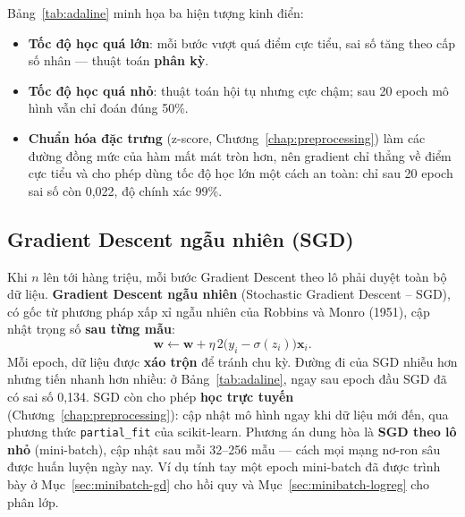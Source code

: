 Bảng~\ref{tab:adaline} minh họa ba hiện tượng kinh điển:
\begin{itemize}
    \item \textbf{Tốc độ học quá lớn}: mỗi bước vượt quá điểm cực tiểu, sai số tăng theo cấp số nhân --- thuật toán \textbf{phân kỳ}.
    \item \textbf{Tốc độ học quá nhỏ}: thuật toán hội tụ nhưng cực chậm; sau 20 epoch mô hình vẫn chỉ đoán đúng 50\%.
    \item \textbf{Chuẩn hóa đặc trưng} (z-score, Chương~\ref{chap:preprocessing}) làm các đường đồng mức của hàm mất mát tròn hơn, nên gradient chỉ thẳng về điểm cực tiểu và cho phép dùng tốc độ học lớn một cách an toàn: chỉ sau 20 epoch sai số còn 0,022, độ chính xác 99\%.
\end{itemize}


\subsection{Gradient Descent ngẫu nhiên (SGD)}

Khi $n$ lên tới hàng triệu, mỗi bước Gradient Descent theo lô phải duyệt toàn bộ dữ liệu. \textbf{Gradient Descent ngẫu nhiên} (Stochastic Gradient Descent -- SGD), có gốc từ phương pháp xấp xỉ ngẫu nhiên của Robbins và Monro (1951), cập nhật trọng số \textbf{sau từng mẫu}:
\begin{equation}
    \mathbf{w} \leftarrow \mathbf{w} + \eta\,2\big(y_i - \sigma(z_i)\big)\mathbf{x}_i .
\end{equation}
Mỗi epoch, dữ liệu được \textbf{xáo trộn} để tránh chu kỳ. Đường đi của SGD nhiễu hơn nhưng tiến nhanh hơn nhiều: ở Bảng~\ref{tab:adaline}, ngay sau epoch đầu SGD đã có sai số 0,134. SGD còn cho phép \textbf{học trực tuyến} (Chương~\ref{chap:preprocessing}): cập nhật mô hình ngay khi dữ liệu mới đến, qua phương thức \texttt{partial\_fit} của scikit-learn. Phương án dung hòa là \textbf{SGD theo lô nhỏ} (mini-batch), cập nhật sau mỗi 32--256 mẫu --- cách mọi mạng nơ-ron sâu được huấn luyện ngày nay. Ví dụ tính tay một epoch mini-batch đã được trình bày ở Mục~\ref{sec:minibatch-gd} cho hồi quy và Mục~\ref{sec:minibatch-logreg} cho phân lớp.

